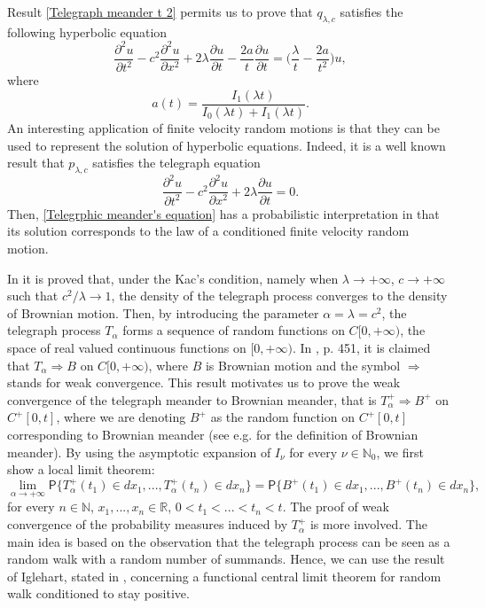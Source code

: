 \documentclass{article}
\theoremstyle{definition}
\numberwithin{equation}{section}
\begin{document}
Result \eqref{Telegraph meander t 2} permits us to prove that $q_{\lambda,c}$ satisfies the following hyperbolic equation
\begin{equation}\label{Telegrphic meander's equation}
\frac{\partial^2 u}{\partial t^2}-c^2\frac{\partial^2 u}{\partial x^2}+2\lambda\frac{\partial u}{\partial  t}-\frac{2a}{t}\frac{\partial u}{\partial t}=\Big(\frac{\lambda}{t}-\frac{2a}{ t^2}\Big)u,
\end{equation}
where 
\begin{equation}
a(t) = \frac{I_1(\lambda t)}{I_0(\lambda t)+I_1(\lambda t)}.
\end{equation}
An interesting application of finite velocity random motions is that they can be used to represent the solution of hyperbolic equations. Indeed, it is a well known result that $p_{\lambda,c}$ satisfies the telegraph equation
\begin{equation}\label{Telegrapher's equation}
\frac{\partial^2u}{\partial t^2}-c^2\frac{\partial^2 u}{\partial x^2}+2\lambda\frac{\partial u}{\partial  t} = 0.
\end{equation}
Then, \eqref{Telegrphic meander's equation} has a probabilistic interpretation in that its solution corresponds to the law of a conditioned finite velocity random motion. 

In \cite{O 1990} it is proved that, under the Kac's condition, namely when $\lambda \to +\infty$, $c \to +\infty$ such that $c^2/\lambda \to 1$, the density of the telegraph process converges to the density of Brownian motion. Then, by introducing the parameter $\alpha = \lambda = c^2$, the telegraph process $T_{\alpha}$ forms a sequence of random functions on $C[0,+\infty)$, the space of real valued continuous functions on $[0,+\infty)$. In \cite{EK 1986}, p. 451, it is claimed that $T_{\alpha} \Rightarrow B$ on $C[0,+\infty)$, where $B$ is Brownian motion and the symbol $\Rightarrow$ stands for weak convergence. This result motivates us to prove the weak convergence of the telegraph meander to Brownian meander, that is $T_{\alpha}^+ \Rightarrow B^+$ on $C^+[0,t]$, where we are denoting $B^+$ as the random function on $C^+[0,t]$ corresponding to Brownian meander (see e.g. \cite{DI 1977} for the definition of Brownian meander). By using the asymptotic expansion of $I_\nu$ for every $\nu \in \mathbb{N}_0$, we first show a local limit theorem: \begin{equation}
\lim_{\alpha \to +\infty}\mathsf{P}\{T^+_{\alpha}(t_1) \in dx_1,...,T^+_{\alpha}(t_n) \in dx_n\} = \mathsf{P}\{B^+(t_1) \in dx_1,...,B^{+}(t_n) \in dx_n\},
\end{equation}
for every $n \in \mathbb{N}$, $x_1,...,x_n \in \mathbb{R}$, $0<t_1<...<t_n<t$. The proof of weak convergence of the probability measures induced by $T^+_\alpha$ is more involved. The main idea is based on the observation that the telegraph process can be seen as a random walk with a random number of summands. Hence, we can use the result of Iglehart, stated in \cite{I 1974}, concerning a functional central limit theorem for random walk conditioned to stay positive. 
\end{document}

